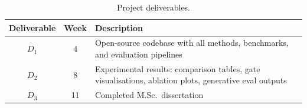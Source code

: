 \begin{table}[htbp]
\centering
\begin{tabular}{@{}ccp{8cm}@{}}
\toprule
\textbf{Deliverable} & \textbf{Week} & \textbf{Description} \\
\midrule
$D_1$ & 4  & Open-source codebase with all methods, benchmarks, and evaluation pipelines \\
$D_2$ & 8  & Experimental results: comparison tables, gate visualisations, ablation plots, generative eval outputs \\
$D_3$ & 11 & Completed M.Sc.\ dissertation \\
\bottomrule
\end{tabular}
\caption{Project deliverables.}
\label{tab:deliverables}
\end{table}
